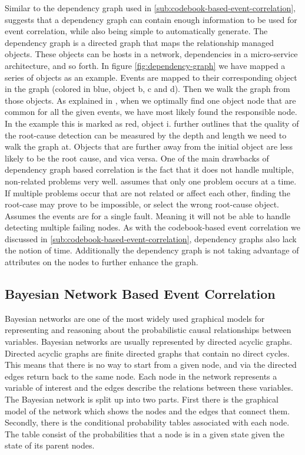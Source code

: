 Similar to the dependency graph used in \ref{sub:codebook-based-event-correlation}, \cite{Gruschke_1998} suggests that a dependency graph can contain enough information to be used for event correlation, while also being simple to automatically generate. The dependency graph is a directed graph that maps the relationship managed objects. These objects can be hosts in a network, dependencies in a micro-service architecture, and so forth.
In figure \ref{fig:dependency-graph} we have mapped a series of objects as an example. Events are mapped to their corresponding object in the graph (colored in blue, object b, c and d). Then we walk the graph from those objects. As explained in \cite{Gruschke_1998}, when we optimally find one object node that are common for all the given events, we have most likely found the responsible node. In the example this is marked as red, object i.
\cite{Gruschke_1998} further outlines that the quality of the root-cause detection can be measured by the depth and length we need to walk the graph at. Objects that are further away from the initial object are less likely to be the root cause, and vica versa.
One of the main drawbacks of dependency graph based correlation is the fact that it does not handle multiple, non-related problems very well. \cite{Gruschke_1998} assumes that only one problem occurs at a time. If multiple problems occur that are not related or affect each other, finding the root-case may prove to be impossible, or select the wrong root-cause object.
Assumes the events are for a single fault. Meaning it will not be able to handle detecting multiple failing nodes.
As with the codebook-based event correlation we discussed in \ref{sub:codebook-based-event-correlation}, dependency graphs also lack the notion of time. Additionally the dependency graph is not taking advantage of attributes on the nodes to further enhance the graph.

\subsection{Bayesian Network Based Event Correlation}

Bayesian networks are one of the most widely used graphical models for representing and reasoning about the probabilistic causal relationships between variables\cite{Kavousi_2014}. Bayesian networks are usually represented by directed acyclic graphs. Directed acyclic graphs are finite directed graphs that contain no direct cycles. This means that there is no way to start from a given node, and via the directed edges return back to the same node. Each node in the network represents a variable of interest and the edges describe the relations between these variables.
The Bayesian network is split up into two parts. First there is the graphical model of the network which shows the nodes and the edges that connect them. Secondly, there is the conditional probability tables associated with each node. The table consist of the probabilities that a node is in a given state given the state of its parent nodes.




